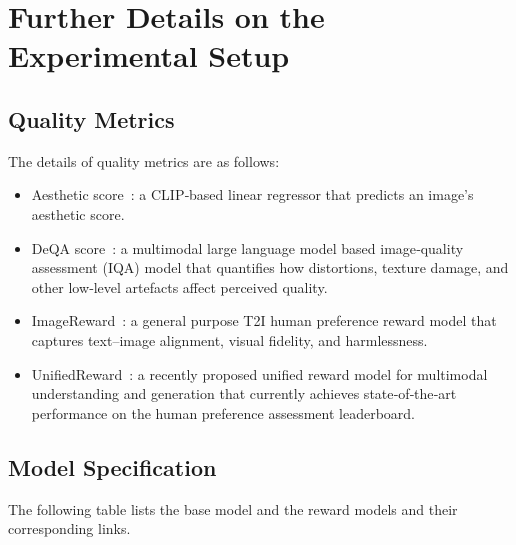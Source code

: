 
\section{Further Details on the Experimental Setup}\label{app:sec:exp-setup-details}

\subsection{Quality Metrics}\label{app:subsubsec:quality_metric}
The details of quality metrics are as follows:
\begin{itemize} [leftmargin=15pt]
  \item Aesthetic score~\cite{schuhmann2022laion}: a CLIP‑based linear regressor that predicts an image’s aesthetic score.
  \item DeQA score~\cite{deqa}: a multimodal large language model based image‑quality assessment (IQA) model that quantifies how distortions, texture damage, and other low‑level artefacts affect perceived quality.
  \item ImageReward~\cite{xu2024imagereward}: a general purpose T2I human preference reward model that captures text–image alignment, visual fidelity, and harmlessness.
  \item UnifiedReward~\cite{wang2025unified}: a recently proposed unified reward model for multimodal understanding and generation that currently achieves state‑of‑the‑art performance on the human preference assessment leaderboard.
\end{itemize}

\subsection{Model Specification}\label{app:subsubsec:synthetic-model}
The following table lists the base model and the reward models and their corresponding links.

